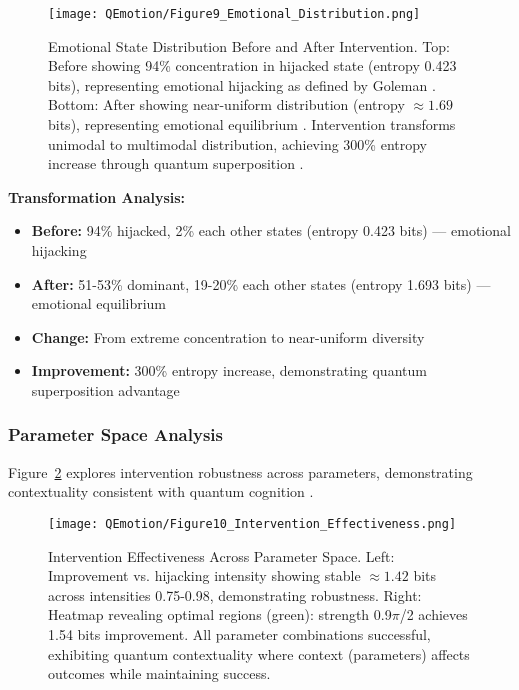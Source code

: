\documentclass[11pt,letterpaper]{article}
\begin{document}
\begin{figure}[H]
\centering
\texttt{[image: QEmotion/Figure9\_Emotional\_Distribution.png]}
\caption{Emotional State Distribution Before and After Intervention. Top: Before showing 94\% concentration in hijacked state (entropy 0.423 bits), representing emotional hijacking as defined by Goleman \cite{goleman1995emotional}. Bottom: After showing near-uniform distribution (entropy $\approx 1.69$ bits), representing emotional equilibrium \cite{gross1998antecedent}. Intervention transforms unimodal to multimodal distribution, achieving 300\% entropy increase through quantum superposition \cite{busemeyer2012quantum}.}
\label{fig:state_distribution}
\end{figure}

\textbf{Transformation Analysis:}
\begin{itemize}
\item \textbf{Before:} 94\% hijacked, 2\% each other states (entropy 0.423 bits) --- emotional hijacking \cite{goleman1995emotional}
\item \textbf{After:} 51-53\% dominant, 19-20\% each other states (entropy 1.693 bits) --- emotional equilibrium \cite{gross1998antecedent}
\item \textbf{Change:} From extreme concentration to near-uniform diversity
\item \textbf{Improvement:} 300\% entropy increase, demonstrating quantum superposition advantage \cite{busemeyer2012quantum}
\end{itemize}

\subsubsection{Parameter Space Analysis}

Figure~\ref{fig:parameter_space} explores intervention robustness across parameters, demonstrating contextuality consistent with quantum cognition \cite{pothos2013can}.

\begin{figure}[H]
\centering
\texttt{[image: QEmotion/Figure10\_Intervention\_Effectiveness.png]}
\caption{Intervention Effectiveness Across Parameter Space. Left: Improvement vs. hijacking intensity showing stable $\approx 1.42$ bits across intensities 0.75-0.98, demonstrating robustness. Right: Heatmap revealing optimal regions (green): strength 0.9$\pi$/2 achieves 1.54 bits improvement. All parameter combinations successful, exhibiting quantum contextuality \cite{pothos2013can} where context (parameters) affects outcomes while maintaining success.}
\label{fig:parameter_space}
\end{figure}
\end{document}
